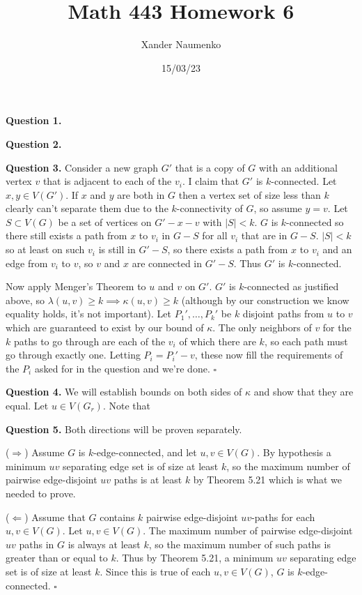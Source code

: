 \documentclass[letterpaper, reqno,11pt]{article}
\begin{document}
\title{Math 443 Homework 6}
\date{15/03/23}
\author{Xander Naumenko}
\maketitle

{\medskip\noindent\bf Question 1.}  

{\medskip\noindent\bf Question 2.} 

{\medskip\noindent\bf Question 3.} Consider a new graph $G'$ that is a copy of $G$ with an additional vertex $v$ that is adjacent to each of the $v_i$. I claim that $G'$ is $k$-connected. Let $x,y\in V(G')$. If $x$ and $y$ are both in $G$ then a vertex set of size less than $k$ clearly can't separate them due to the $k$-connectivity of $G$, so assume $y=v$. Let $S\subset V(G)$ be a set of vertices on $G'-x-v$ with $|S|<k$. $G$ is $k$-connected so there still exists a path from $x$ to $v_i$ in $G-S$ for all $v_i$ that are in $G-S$. $|S|<k$ so at least on such $v_i$ is still in $G'-S$, so there exists a path from $x$ to $v_i$ and an edge from $v_i$ to $v$, so $v$ and $x$ are connected in $G'-S$. Thus $G'$ is $k$-connected. 

Now apply Menger's Theorem to $u$ and $v$ on $G'$. $G'$ is $k$-connected as justified above, so $\lambda(u,v)\geq k\implies \kappa(u,v)\geq k$ (although by our construction we know equality holds, it's not important). Let $P_1', \ldots, P_k'$ be $k$ disjoint paths from $u$ to $v$ which are guaranteed to exist by our bound of $\kappa$. The only neighbors of $v$ for the $k$ paths to go through are each of the $v_i$ of which there are $k$, so each path must go through exactly one. Letting $P_i=P_i'-v$, these now fill the requirements of the $P_i$ asked for in the question and we're done. $\square$

{\medskip\noindent\bf Question 4.} We will establish bounds on both sides of $\kappa$ and show that they are equal. Let $u\in V(G_r)$. Note that 

{\medskip\noindent\bf Question 5.} Both directions will be proven separately. 

($\Rightarrow$) Assume $G$ is $k$-edge-connected, and let $u,v\in V(G)$. By hypothesis a minimum $uv$ separating edge set is of size at least $k$, so the maximum number of pairwise edge-disjoint $uv$ paths is at least $k$ by Theorem 5.21 which is what we needed to prove. 

($\Leftarrow$) Assume that $G$ contains $k$ pairwise edge-disjoint $uv$-paths for each $u,v\in V(G)$. Let $u,v\in V(G)$. The maximum number of pairwise edge-disjoint $uv$ paths in $G$ is always at least $k$, so the maximum number of such paths is greater than or equal to $k$. Thus by Theorem 5.21, a minimum $uv$ separating edge set is of size at least $k$. Since this is true of each $u,v\in V(G)$, $G$ is $k$-edge-connected. $\square$
\end{document}
